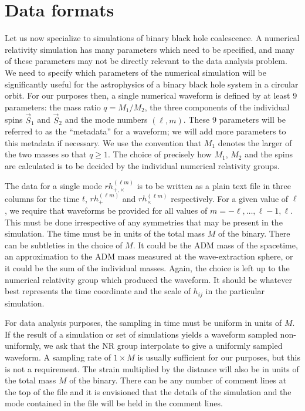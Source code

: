 \documentclass[10pt]{ligodcc}
\begin{document}
\section{Data formats}
\label{sec:format}


Let us now specialize to simulations of binary black hole coalescence.
A numerical relativity simulation has many parameters which need to be
specified, and many of these parameters may not be directly relevant
to the data analysis problem.  We need to specify which parameters of
the numerical simulation will be significantly useful for the
astrophysics of a binary black hole system in a circular orbit.  For
our purposes then, a single numerical waveform is defined by at least
9 parameters: the mass ratio $q = M_1/M_2$, the three components of
the individual spins $\vec{S}_1$ and $\vec{S}_2$ and the mode numbers
$(\ell,m)$.  These 9 parameters will be referred to as the
``metadata'' for a waveform; we will add more parameters to this
metadata if necessary. We use the convention that $M_1$ denotes the
larger of the two masses so that $q\geq 1$.  The choice of precisely
how $M_1$, $M_2$ and the spins are calculated is to be decided by the
individual numerical relativity groups.

The data for a single mode $rh_{+,\times}^{(\ell m)}$ is to be written as a
plain text file in three columns for the time $t$, $rh_+^{(\ell m)}$ and
$rh_\times^{(\ell m)}$ respectively.  For a given value of $\ell$, we require
that waveforms be provided for all values of
$m=-\ell,\ldots,\ell-1,\ell$.  This must be done irrespective of any
symmetries that may be present in the simulation.  The time must be in
units of the total mass $M$ of the binary.  There can be subtleties in
the choice of $M$.  It could be the ADM mass of the spacetime, an
approximation to the ADM mass measured at the wave-extraction sphere,
or it could be the sum of the individual masses.  Again, the choice is
left up to the numerical relativity group which produced the waveform.
It should be whatever best represents the time coordinate and the
scale of $h_{ij}$ in the particular simulation.

For data analysis purposes, the sampling in time must be uniform in
units of $M$.  If the result of a simulation or set of simulations
yields a waveform sampled non-uniformly, we ask that the NR group
interpolate to give a uniformly sampled waveform.  A sampling rate of
$1\times M$ is usually sufficient for our purposes, but this is not a
requirement.  The strain multiplied by the distance will also be in
units of the total mass $M$ of the binary.  There can be any number of
comment lines at the top of the file and it is envisioned that the
details of the simulation and the mode contained in the file will be
held in the comment lines.
\end{document}

